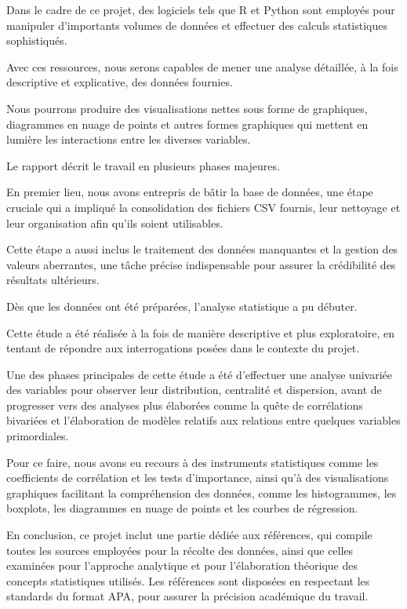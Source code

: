 \documentclass[
]{article}
\begin{document}
Dans le cadre de ce projet, des logiciels tels que R et Python sont
employés pour manipuler d'importants volumes de données et effectuer des
calculs statistiques sophistiqués.

Avec ces ressources, nous serons capables de mener une analyse
détaillée, à la fois descriptive et explicative, des données fournies.

Nous pourrons produire des visualisations nettes sous forme de
graphiques, diagrammes en nuage de points et autres formes graphiques
qui mettent en lumière les interactions entre les diverses variables.

Le rapport décrit le travail en plusieurs phases majeures.

En premier lieu, nous avons entrepris de bâtir la base de données, une
étape cruciale qui a impliqué la consolidation des fichiers CSV fournis,
leur nettoyage et leur organisation afin qu'ils soient utilisables.

Cette étape a aussi inclus le traitement des données manquantes et la
gestion des valeurs aberrantes, une tâche précise indispensable pour
assurer la crédibilité des résultats ultérieurs.

Dès que les données ont été préparées, l'analyse statistique a pu
débuter.

Cette étude a été réalisée à la fois de manière descriptive et plus
exploratoire, en tentant de répondre aux interrogations posées dans le
contexte du projet.

Une des phases principales de cette étude a été d'effectuer une analyse
univariée des variables pour observer leur distribution, centralité et
dispersion, avant de progresser vers des analyses plus élaborées comme
la quête de corrélations bivariées et l'élaboration de modèles relatifs
aux relations entre quelques variables primordiales.

Pour ce faire, nous avons eu recours à des instruments statistiques
comme les coefficients de corrélation et les tests d'importance, ainsi
qu'à des visualisations graphiques facilitant la compréhension des
données, comme les histogrammes, les boxplots, les diagrammes en nuage
de points et les courbes de régression.

En conclusion, ce projet inclut une partie dédiée aux références, qui
compile toutes les sources employées pour la récolte des données, ainsi
que celles examinées pour l'approche analytique et pour l'élaboration
théorique des concepts statistiques utilisés. Les références sont
disposées en respectant les standards du format APA, pour assurer la
précision académique du travail.
\end{document}
